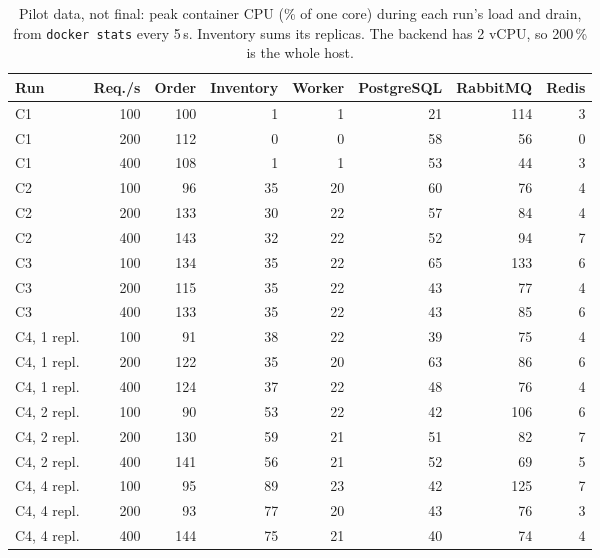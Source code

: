 \documentclass[a4paper]{report}
\begin{document}
\begin{table}[tbp]
\centering
\scriptsize
\caption{Pilot data, not final: peak container CPU (\% of one core) during each
run's load and drain, from \texttt{docker stats} every 5\,s. Inventory sums its
replicas. The backend has 2 vCPU, so 200\,\% is the whole host.}
\label{tab:pilot-resource}
\begin{adjustbox}{max width=\linewidth}
\begin{tabular}{@{}lrrrrrrr@{}}
\toprule
Run & Req./s & Order & Inventory & Worker & PostgreSQL & RabbitMQ & Redis \\
\midrule
C1 & 100 & 100 & 1 & 1 & 21 & 114 & 3 \\
C1 & 200 & 112 & 0 & 0 & 58 & 56 & 0 \\
C1 & 400 & 108 & 1 & 1 & 53 & 44 & 3 \\
C2 & 100 & 96 & 35 & 20 & 60 & 76 & 4 \\
C2 & 200 & 133 & 30 & 22 & 57 & 84 & 4 \\
C2 & 400 & 143 & 32 & 22 & 52 & 94 & 7 \\
C3 & 100 & 134 & 35 & 22 & 65 & 133 & 6 \\
C3 & 200 & 115 & 35 & 22 & 43 & 77 & 4 \\
C3 & 400 & 133 & 35 & 22 & 43 & 85 & 6 \\
C4, 1 repl. & 100 & 91 & 38 & 22 & 39 & 75 & 4 \\
C4, 1 repl. & 200 & 122 & 35 & 20 & 63 & 86 & 6 \\
C4, 1 repl. & 400 & 124 & 37 & 22 & 48 & 76 & 4 \\
C4, 2 repl. & 100 & 90 & 53 & 22 & 42 & 106 & 6 \\
C4, 2 repl. & 200 & 130 & 59 & 21 & 51 & 82 & 7 \\
C4, 2 repl. & 400 & 141 & 56 & 21 & 52 & 69 & 5 \\
C4, 4 repl. & 100 & 95 & 89 & 23 & 42 & 125 & 7 \\
C4, 4 repl. & 200 & 93 & 77 & 20 & 43 & 76 & 3 \\
C4, 4 repl. & 400 & 144 & 75 & 21 & 40 & 74 & 4 \\
\bottomrule
\end{tabular}
\end{adjustbox}
\end{table}
\end{document}
